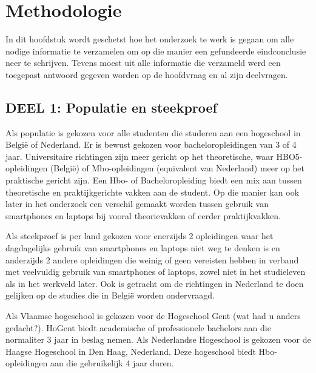 
\chapter{Methodologie}
\label{ch:methodologie}

In dit hoofdstuk wordt geschetst hoe het onderzoek te werk is gegaan om alle nodige informatie te verzamelen om op die manier een gefundeerde eindconclusie neer te schrijven. Tevens moest uit alle informatie die verzameld werd een toegepast antwoord gegeven worden op de hoofdvraag en al zijn deelvragen.

\section{DEEL 1: Populatie en steekproef}
\label{sec:popsteek}

Als populatie is gekozen voor alle studenten die studeren aan een hogeschool in België of Nederland. Er is bewust gekozen voor bacheloropleidingen van 3 of 4 jaar. Universitaire richtingen zijn meer gericht op het theoretische, waar HBO5-opleidingen (België) of Mbo-opleidingen (equivalent van Nederland) meer op het praktische gericht zijn. Een Hbo- of Bacheloropleiding biedt een mix aan tussen theoretische en praktijkgerichte vakken aan de student. Op die manier kan ook later in het onderzoek een verschil gemaakt worden tussen gebruik van smartphones en laptops bij vooral theorievakken of eerder praktijkvakken. 

Als steekproef is per land gekozen voor enerzijds 2 opleidingen waar het dagdagelijks gebruik van smartphones en laptops niet weg te denken is en anderzijds 2 andere opleidingen die weinig of geen vereisten hebben in verband met veelvuldig gebruik van smartphones of laptops, zowel niet in het studieleven als in het werkveld later. Ook is getracht om de richtingen in Nederland te doen gelijken op de studies die in België worden ondervraagd.

Als Vlaamse hogeschool is gekozen voor de Hogeschool Gent (wat had u anders gedacht?). HoGent biedt academische of professionele bachelors aan die normaliter 3 jaar in beslag nemen. Als Nederlandse Hogeschool is gekozen voor de Haagse Hogeschool in Den Haag, Nederland. Deze hogeschool biedt Hbo-opleidingen aan die gebruikelijk 4 jaar duren.

